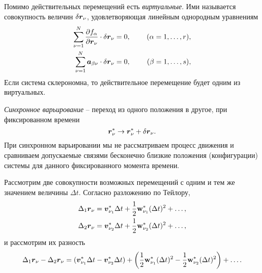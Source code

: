 Помимо действительных перемещений есть \textit{виртуальные}. Ими называется совокупность величин $\delta \mbox{\boldmath $r$}_\nu$, удовлетворяющая линейным однородным уравнениям
\begin{align}
\label{eqs12}
    \sum_{\nu=1}^N \frac{\partial f_\alpha}{\partial \mbox{\boldmath $r$}_\nu} \cdot \delta \mbox{\boldmath $r$}_\nu  &= 0,
    \hspace{0.5cm} &(\alpha = 1, \ldots, r), \\
\label{eqs13}
    \sum_{\nu=1}^N \mbox{\boldmath $a$}_{\beta\nu} \cdot \delta \mbox{\boldmath $r$}_\nu  &= 0,
    \hspace{0.5cm} &(\beta = 1, \ldots, s),
\end{align}
Если система склерономна, то действительное перемещение будет одним из виртуальных.

\begin{to_def} 
    \textit{Синхронное варьирование} -- переход из одного положения в другое, при фиксированном времени
    $$
        \mbox{\boldmath $r$}_\nu^* \to \mbox{\boldmath $r$}_\nu^* + \delta \mbox{\boldmath $r$}_\nu.
    $$
    При синхронном варьировании мы не рассматриваем процесс движения и сравниваем допускаемые связями
    бесконечно близкие положения (конфигурации) системы для данного фиксированного момента времени.
\end{to_def}

Рассмотрим две совокупности возможных перемещений с одним и тем же значением величины $\Delta t$. Согласно разложению по Тейлору,
\begin{align*}
    \Delta_1 \mbox{\boldmath $r$}_\nu = \mbox{\boldmath $v$}_{\nu_1}^* \Delta t + \frac{1}{2} \mbox{\boldmath $\mathrm{w}$}_{\nu_1}^* (\Delta t)^2 + \ldots, \\
    \Delta_2 \mbox{\boldmath $r$}_\nu = \mbox{\boldmath $v$}_{\nu_2}^* \Delta t + \frac{1}{2} \mbox{\boldmath $\mathrm{w}$}_{\nu_2}^* (\Delta t)^2 + \ldots, 
\end{align*}
и рассмотрим их разность
$$
        \Delta_1 \mbox{\boldmath $r$}_\nu - \Delta_2 \mbox{\boldmath $r$}_\nu = (\mbox{\boldmath $v$}_{\nu_1}^* \Delta t - \mbox{\boldmath $v$}_{\nu_2}^* \Delta t) + \left(\frac{1}{2} \mbox{\boldmath $\mathrm{w}$}_{\nu_1}^* (\Delta t)^2 - \frac{1}{2} \mbox{\boldmath $\mathrm{w}$}_{\nu_2}^* (\Delta t)^2\right) + \ldots.
$$
